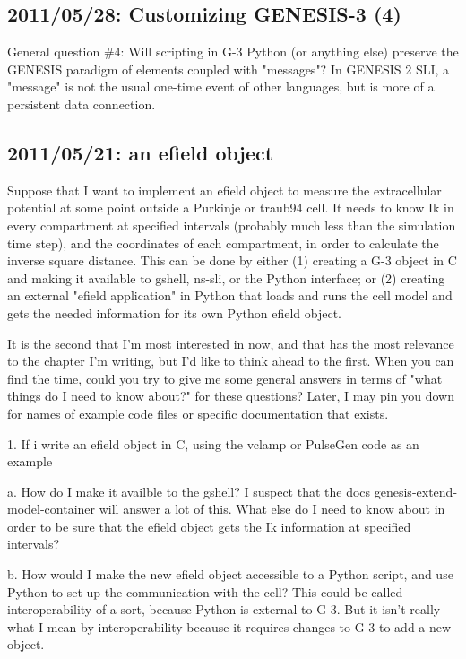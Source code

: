 \documentclass[12pt]{article}
\begin{document}
\subsection{2011/05/28: Customizing GENESIS-3 (4)}

General question \#4: Will scripting in G-3 Python (or anything else)
preserve the GENESIS paradigm of elements coupled with "messages"?  In
GENESIS 2 SLI, a "message" is not the usual one-time event of other
languages, but is more of a persistent data connection.


\subsection{2011/05/21: an efield object}

Suppose that I want to implement an efield object to measure the
extracellular potential at some point outside a Purkinje or traub94 cell.
It needs to know Ik in every compartment at specified intervals (probably
much less than the simulation time step), and the coordinates of each
compartment, in order to calculate the inverse square distance.  This can
be done by either (1) creating a G-3 object in C and making it available to
gshell, ns-sli, or the Python interface; or (2) creating an external
"efield application" in Python that loads and runs the cell model and gets
the needed information for its own Python efield object.

It is the second that I'm most interested in now, and that has the most
relevance to the chapter I'm writing, but I'd like to think ahead to
the first.  When you can find the time, could you try to give me some
general answers in terms of "what things do I need to know about?"
for these questions?  Later, I may pin you down for names of example
code files or specific documentation that exists.

1.  If i write an efield object in C, using the vclamp or PulseGen
code as an example

   a. How do I make it availble to the gshell?  I suspect that the docs
   genesis-extend-model-container will answer a lot of this.  What else do
   I need to know about in order to be sure that the efield object gets
   the Ik information at specified intervals?

   b. How would I make the new efield object accessible to a Python
   script, and use Python to set up the communication with the cell?
   This could be called interoperability of a sort, because Python
   is external to G-3. But it isn't really what I mean by
   interoperability because it requires changes to G-3 to add a new
   object.
\end{document}
